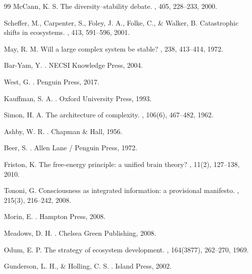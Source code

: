 \documentclass[11pt,a4paper]{article}
\begin{document}
\begin{thebibliography}{99}
McCann, K. S.
\newblock The diversity--stability debate.
, 405, 228--233, 2000.

Scheffer, M., Carpenter, S., Foley, J. A., Folke, C., \& Walker, B.
\newblock Catastrophic shifts in ecosystems.
, 413, 591--596, 2001.

May, R. M.
\newblock Will a large complex system be stable?
, 238, 413--414, 1972.

Bar-Yam, Y.
.
\newblock NECSI Knowledge Press, 2004.

West, G.
.
\newblock Penguin Press, 2017.

Kauffman, S. A.
.
\newblock Oxford University Press, 1993.

Simon, H. A.
\newblock The architecture of complexity.
, 106(6), 467--482, 1962.

Ashby, W. R.
.
\newblock Chapman \& Hall, 1956.

Beer, S.
.
\newblock Allen Lane / Penguin Press, 1972.

Friston, K.
\newblock The free-energy principle: a unified brain theory?
, 11(2), 127--138, 2010.

Tononi, G.
\newblock Consciousness as integrated information: a provisional manifesto.
, 215(3), 216--242, 2008.

Morin, E.
.
\newblock Hampton Press, 2008.

Meadows, D. H.
.
\newblock Chelsea Green Publishing, 2008.

Odum, E. P.
\newblock The strategy of ecosystem development.
, 164(3877), 262--270, 1969.

Gunderson, L. H., \& Holling, C. S.
.
\newblock Island Press, 2002.


\end{thebibliography}
\end{document}
